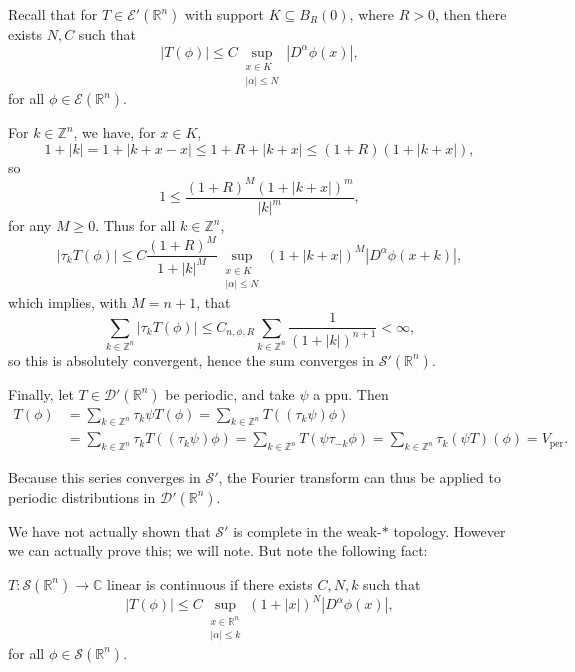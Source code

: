 \documentclass[12pt]{article}
\begin{document}
\begin{proofbox}
	Recall that for $T \in \mathcal{E}'(\mathbb{R}^n)$ with support $K \subseteq B_R(0)$, where $R > 0$, then there exists $N, C$ such that
	\[
		|T(\phi)| \leq C \sup_{\substack{x \in K \\ |\alpha| \leq N}} |D^\alpha \phi(x)|,
	\]
	for all $\phi \in \mathcal{E}(\mathbb{R}^n)$.

	For $k \in \mathbb{Z}^n$, we have, for $x \in K$,
	\[
	1 + |k| = 1 + |k + x - x| \leq 1 + R + |k + x| \leq (1 + R)(1 + |k + x|),
	\]
	so
	\[
	1 \leq \frac{(1 + R)^M(1 + |k + x|)^m}{|k|^m},
	\]
	for any $M \geq 0$. Thus for all $k \in \mathbb{Z}^n$,
	\[
		|\tau_k T(\phi)| \leq C \frac{(1 + R)^M}{1 + |k|^M} \sup_{\substack{x \in K \\ |\alpha| \leq N}} (1 + |k + x|)^M |D^\alpha \phi(x + k)|,
	\]
	which implies, with $M = n + 1$, that
	\[
	\sum_{k \in \mathbb{Z}^n} |\tau_k T(\phi)| \leq C_{n, \phi, R} \sum_{k \in \mathbb{Z}^n} \frac{1}{(1 + |k|)^{n+1}}< \infty,
	\]
	so this is absolutely convergent, hence the sum converges in $\mathcal{S}'(\mathbb{R}^n)$.

	Finally, let $T \in \mathcal{D}'(\mathbb{R}^n)$ be periodic, and take $\psi$ a ppu. Then
	\begin{align*}
		T(\phi) &= \sum_{k \in \mathbb{Z}^n} \tau_k \psi T(\phi) = \sum_{k \in \mathbb{Z}^n} T((\tau_k \psi) \phi) \\
			&= \sum_{k \in \mathbb{Z}^n} \tau_k T((\tau_k \psi) \phi) = \sum_{k \in \mathbb{Z}^n} T(\psi \tau_{-k} \phi) = \sum_{k \in \mathbb{Z}^n} \tau_k (\psi T)(\phi) = V_{\mathrm{per}}.
	\end{align*}
\end{proofbox}

Because this series converges in $\mathcal{S}'$, the Fourier transform can thus be applied to periodic distributions in $\mathcal{D}'(\mathbb{R}^n)$.

We have not actually shown that $\mathcal{S}'$ is complete in the weak-$\ast$ topology. However we can actually prove this; we will note. But note the following fact:

\begin{proposition}
	$T : \mathcal{S}(\mathbb{R}^n) \to \mathbb{C}$ linear is continuous if there exists $C, N, k$ such that
	\[
		|T(\phi)| \leq C \sup_{\substack{x \in \mathbb{R}^n \\ |\alpha| \leq k}} (1+|x|)^N |D^\alpha \phi(x)|,
	\]
	for all $\phi \in \mathcal{S}(\mathbb{R}^n)$.
\end{proposition}
\end{document}
